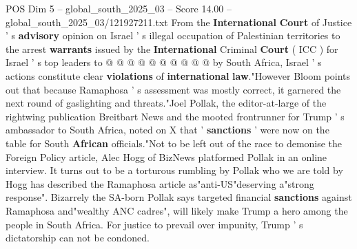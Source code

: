 \begin{textsample}{POS Dim 5 – global\_south\_2025\_03 – Score 14.00 – global\_south\_2025\_03/121927211.txt}
From the \textbf{International} \textbf{Court} of Justice ' s \textbf{advisory} opinion on Israel ' s illegal occupation of Palestinian territories to the arrest \textbf{warrants} issued by the \textbf{International} Criminal \textbf{Court} ( ICC ) for Israel ' s top leaders to @ @ @ @ @ @ @ @ @ @ by South Africa, Israel ' s actions constitute clear \textbf{violations} of \textbf{international} \textbf{law}."However Bloom points out that because Ramaphosa ' s assessment was mostly correct, it garnered the next round of gaslighting and threats."Joel Pollak, the editor-at-large of the rightwing publication Breitbart News and the mooted frontrunner for Trump ' s ambassador to South Africa, noted on X that ' \textbf{sanctions} ' were now on the table for South \textbf{African} officials."Not to be left out of the race to demonise the Foreign Policy article, Alec Hogg of BizNews platformed Pollak in an online interview.
It turns out to be a torturous rumbling by Pollak who we are told by Hogg has described the Ramaphosa article as"anti-US"deserving a"strong response".
Bizarrely the SA-born Pollak says targeted financial \textbf{sanctions} against Ramaphosa and"wealthy ANC cadres", will likely make Trump a hero among the people in South Africa.
For justice to prevail over impunity, Trump ' s dictatorship can not be condoned.

\end{textsample}
